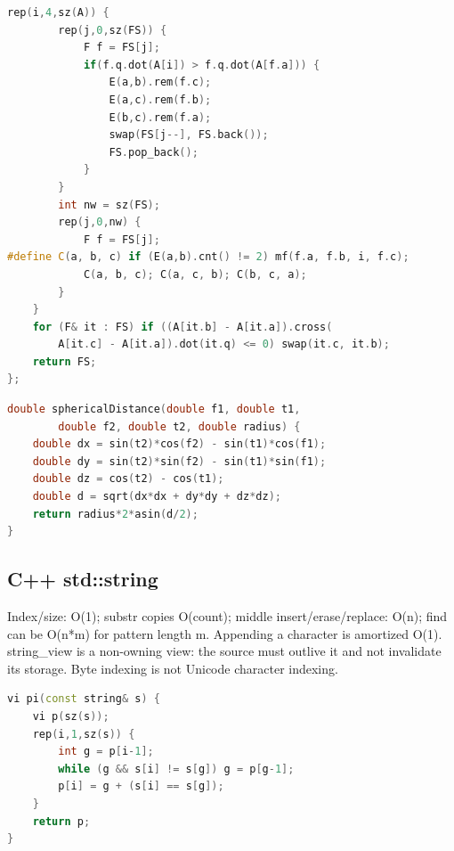 \begin{multicols}{\Columns}
\begin{lstlisting}[language=C++]
	rep(i,4,sz(A)) {
		rep(j,0,sz(FS)) {
			F f = FS[j];
			if(f.q.dot(A[i]) > f.q.dot(A[f.a])) {
				E(a,b).rem(f.c);
				E(a,c).rem(f.b);
				E(b,c).rem(f.a);
				swap(FS[j--], FS.back());
				FS.pop_back();
			}
		}
		int nw = sz(FS);
		rep(j,0,nw) {
			F f = FS[j];
#define C(a, b, c) if (E(a,b).cnt() != 2) mf(f.a, f.b, i, f.c);
			C(a, b, c); C(a, c, b); C(b, c, a);
		}
	}
	for (F& it : FS) if ((A[it.b] - A[it.a]).cross(
		A[it.c] - A[it.a]).dot(it.q) <= 0) swap(it.c, it.b);
	return FS;
};
\end{lstlisting}

\begin{lstlisting}[language=C++]
double sphericalDistance(double f1, double t1,
		double f2, double t2, double radius) {
	double dx = sin(t2)*cos(f2) - sin(t1)*cos(f1);
	double dy = sin(t2)*sin(f2) - sin(t1)*sin(f1);
	double dz = cos(t2) - cos(t1);
	double d = sqrt(dx*dx + dy*dy + dz*dz);
	return radius*2*asin(d/2);
}
\end{lstlisting}


\subsection{C++ std::string}
 Index/size: O(1); substr copies O(count); middle insert/erase/replace: O(n); find can be O(n*m) for pattern length m. Appending a character is amortized O(1). string\_view is a non-owning view: the source must outlive it and not invalidate its storage. Byte indexing is not Unicode character indexing.\par


\begin{lstlisting}[language=C++]
vi pi(const string& s) {
	vi p(sz(s));
	rep(i,1,sz(s)) {
		int g = p[i-1];
		while (g && s[i] != s[g]) g = p[g-1];
		p[i] = g + (s[i] == s[g]);
	}
	return p;
}


\end{lstlisting}
\end{multicols}
